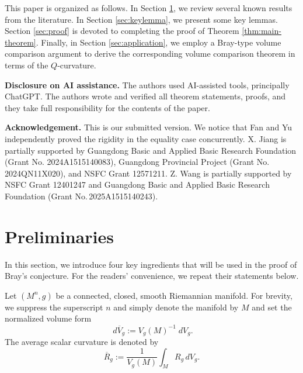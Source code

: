 \documentclass[11pt, reqno]{amsart}
\numberwithin{equation}{section}
\theoremstyle{remark}
\newcommand{\dbarV}[1]{d\overline V_{#1}}
\begin{document}
This paper is organized as follows. In Section \ref{sec:pre}, we review several known results from the literature. In Section \ref{sec:keylemma}, we present some key lemmas. Section \ref{sec:proof} is devoted to completing the proof of Theorem \ref{thm:main-theorem}. Finally, in Section \ref{sec:application}, we employ a Bray-type volume comparison argument to derive the corresponding volume comparison theorem in terms of the $Q$-curvature.


\vspace{3em}
{\bf Disclosure on AI assistance.} The authors used AI-assisted tools, principally ChatGPT. The authors wrote and verified all theorem statements, proofs, and they take full responsibility for the contents of the paper.


{\bf Acknowledgement.} This is our submitted version. We notice that Fan and Yu \cite{fanyu} independently proved the rigidity in the equality case concurrently.  X. Jiang is partially supported by Guangdong Basic and Applied Basic Research Foundation (Grant No. 2024A1515140083), Guangdong Provincial Project (Grant No. 2024QN11X020),
and NSFC Grant 12571211. Z. Wang is partially supported by NSFC Grant 12401247 and Guangdong Basic and Applied Basic Research Foundation (Grant No.\,{2025A1515140243}).


\section{Preliminaries}\label{sec:pre}

In this section, we introduce four key ingredients that will be used in the proof of Bray’s conjecture.  For the readers' convenience, we repeat their statements below.

Let $(M^n,g)$ be a connected, closed, smooth Riemannian manifold. 
For brevity, we suppress the superscript  $n$ and simply denote the manifold by $M$ and set the normalized volume form 
$$\; \dbarV g:=V_g(M)^{-1}\; d V_g.$$
{The average scalar curvature is denoted by
\begin{equation}\label{eq:average-scalar}
\overline R_g:=\frac1{V_g(M)}\int_MR_g\,dV_g.
\end{equation}}
\end{document}
